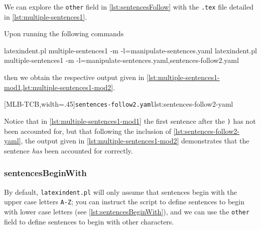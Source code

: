  \begin{example}
 We can explore the \texttt{other} field in \cref{lst:sentencesFollow} with the
 \texttt{.tex} file detailed in \cref{lst:multiple-sentences1}.


 Upon running the following commands  
 \begin{widepage}

  \begin{commandshell}
latexindent.pl multiple-sentences1 -m -l=manipulate-sentences.yaml
latexindent.pl multiple-sentences1 -m -l=manipulate-sentences.yaml,sentences-follow2.yaml
\end{commandshell}

 \end{widepage}
 then we obtain the respective output given in
 \cref{lst:multiple-sentences1-mod1,lst:multiple-sentences1-mod2}.

 \begin{cmhtcbraster}[
   raster force size=false,
   raster column 1/.style={add to width=1cm},
  ]
  [MLB-TCB,width=.45\textwidth]{\texttt{sentences-follow2.yaml}}{lst:sentences-follow2-yaml}
 \end{cmhtcbraster}

 Notice that in \cref{lst:multiple-sentences1-mod1} the first sentence after the
 \texttt{)} has not been accounted for, but that following the inclusion of
 \cref{lst:sentences-follow2-yaml}, the output given in
 \cref{lst:multiple-sentences1-mod2} demonstrates that the sentence \emph{has} been
 accounted for correctly.
 \end{example}

\subsubsection{sentencesBeginWith}
 By default, \texttt{latexindent.pl} will only assume that sentences begin with the upper
 case letters \texttt{A-Z}; you can instruct the script to define sentences to begin with
 lower case letters (see \cref{lst:sentencesBeginWith}), and we can use the
 \texttt{other} field to define sentences to begin with other characters.

